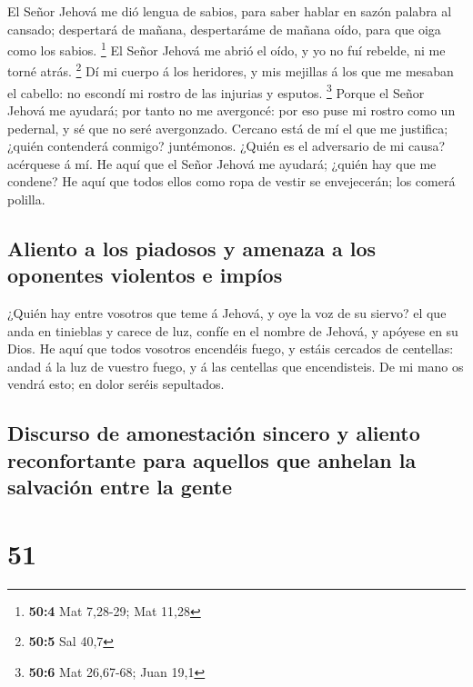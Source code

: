  El Señor Jehová me dió lengua de sabios, para saber hablar
en sazón palabra al cansado; despertará de mañana, despertaráme de
mañana oído, para que oiga como los sabios. \footnote{\textbf{50:4} Mat
  7,28-29; Mat 11,28}  El Señor Jehová me abrió el oído, y
yo no fuí rebelde, ni me torné atrás. \footnote{\textbf{50:5} Sal 40,7}
 Dí mi cuerpo á los heridores, y mis mejillas á los que me
mesaban el cabello: no escondí mi rostro de las injurias y esputos.
\footnote{\textbf{50:6} Mat 26,67-68; Juan 19,1}  Porque el
Señor Jehová me ayudará; por tanto no me avergoncé: por eso puse mi
rostro como un pedernal, y sé que no seré avergonzado. 
Cercano está de mí el que me justifica; ¿quién contenderá conmigo?
juntémonos. ¿Quién es el adversario de mi causa? acérquese á mí.
 He aquí que el Señor Jehová me ayudará; ¿quién hay que me
condene? He aquí que todos ellos como ropa de vestir se envejecerán; los
comerá polilla.

\hypertarget{aliento-a-los-piadosos-y-amenaza-a-los-oponentes-violentos-e-impuxedos}{%
\subsection{Aliento a los piadosos y amenaza a los oponentes violentos e
impíos}\label{aliento-a-los-piadosos-y-amenaza-a-los-oponentes-violentos-e-impuxedos}}

 ¿Quién hay entre vosotros que teme á Jehová, y oye la voz
de su siervo? el que anda en tinieblas y carece de luz, confíe en el
nombre de Jehová, y apóyese en su Dios.  He aquí que todos
vosotros encendéis fuego, y estáis cercados de centellas: andad á la luz
de vuestro fuego, y á las centellas que encendisteis. De mi mano os
vendrá esto; en dolor seréis sepultados.

\hypertarget{discurso-de-amonestaciuxf3n-sincero-y-aliento-reconfortante-para-aquellos-que-anhelan-la-salvaciuxf3n-entre-la-gente}{%
\subsection{Discurso de amonestación sincero y aliento reconfortante
para aquellos que anhelan la salvación entre la
gente}\label{discurso-de-amonestaciuxf3n-sincero-y-aliento-reconfortante-para-aquellos-que-anhelan-la-salvaciuxf3n-entre-la-gente}}

\hypertarget{section-50}{%
\section{51}\label{section-50}}

